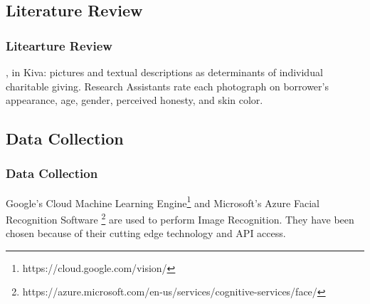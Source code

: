 \documentclass{beamer}
\begin{document}
\subsection{Literature Review}
\begin{frame}\frametitle{Litearture Review}
\textcite{Jenq2011} , in Kiva: pictures and textual descriptions as determinants of individual charitable giving. Research Assistants rate each photograph on borrower's appearance, age, gender, perceived honesty, and skin color. 
\end{frame}

\subsection{Data Collection}
\begin{frame}\frametitle{Data Collection}
Google's Cloud Machine Learning Engine\footnote{https://cloud.google.com/vision/} and Microsoft's Azure Facial Recognition Software \footnote{https://azure.microsoft.com/en-us/services/cognitive-services/face/} are used to perform Image Recognition. They have been chosen because of their cutting edge technology and API access.
\end{frame}
\end{document}
